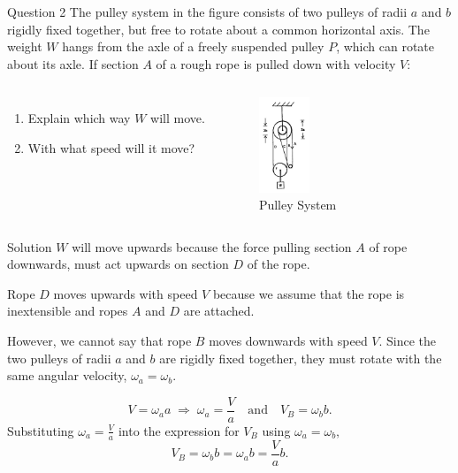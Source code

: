 \documentclass{beamer}
\begin{document}
    \begin{frame}{Question 2}
        The pulley system in the figure consists of two pulleys of radii \(a\) and \(b\) rigidly fixed together, but free to rotate about a common horizontal axis. The weight \(W\) hangs from the axle of a freely suspended pulley \(P\), which can rotate about its axle. If section \(A\) of a rough rope is pulled down with velocity \(V\): \pause

        \begin{columns}

                \begin{enumerate}
                    \item Explain which way \(W\) will move. \pause
                    \item With what speed will it move? \pause\\
                \end{enumerate}
            
                \begin{figure}
                    \centering
                    \includegraphics[width=15mm]{z20121b.png}
                    \caption{Pulley System}
                    \label{i1}
                \end{figure}

        \end{columns}
    \end{frame}

    \begin{frame}{Solution}
        \(W\) will move upwards because the force pulling section \(A\) of rope downwards, must act upwards on section \(D\) of the rope.\pause 

        Rope \(D\) moves upwards with speed \(V\) because we assume that the rope is inextensible and ropes \(A\) and \(D\) are attached.\pause

        However, we cannot say that rope \(B\) moves downwards with speed \(V\). Since the two pulleys of radii \(a\) and \(b\) are rigidly fixed together, they must rotate with the same angular velocity, \(\omega_a = \omega_b\).

        \[V = \omega_aa \;\Rightarrow\; \omega_a = \frac{V}{a} \quad\text{and}\quad V_B = \omega_bb.\]\pause
        Substituting \(\omega_a = \frac{V}{a}\) into the expression for \(V_B\) using \(\omega_a = \omega_b,\)
        \[V_B = \omega_bb = \omega_ab = \frac{V}{a}b.\]
    \end{frame}
\end{document}
